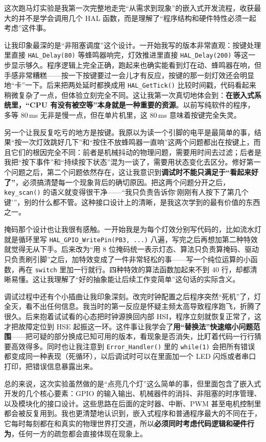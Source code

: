 \documentclass[UTF8,zihao=5,fontset=fandol]{ctexart}
\begin{document}
\begin{reportsection}{\ReflectionTitle}{\ReflectionHint}
  这次跑马灯实验是我第一次完整地走完“从需求到现象”的嵌入式开发流程，收获最大的并不是学会调用几个 HAL 函数，而是理解了“程序结构和硬件特性必须一起考虑”这件事。

  让我印象最深的是“非阻塞调度”这个设计。一开始我写的版本非常直观：按键处理里直接 \texttt{HAL\_Delay(80)} 等蜂鸣器响完，灯效推进里直接 \texttt{HAL\_Delay(200)} 等这一步显示够久。程序逻辑上完全正确，跑起来也确实能看到灯在动、蜂鸣器在响，但手感非常糟糕——按一下按键要过一会儿才有反应，按键的那一刻灯效还会明显地“卡”一下。后来把两处延时都换成用 \texttt{HAL\_GetTick()} 比较时间戳，代码看起来稍微复杂了一点，但体验立刻完全不同。这让我第一次真切地体会到：\textbf{在嵌入式系统里，“CPU 有没有被空等”本身就是一种重要的资源}。以前写纯软件的程序，多等 80\,ms 无非是慢一点，但在单片机里，这 80\,ms 意味着按键完全失灵。

  另一个让我反复吃亏的地方是按键。我原以为读一个引脚的电平是最简单的事，结果“按一次灯效跳好几下”和“按住不放蜂鸣器一直响”这两个问题都出在按键上，而且它们的根因完全不同：前者是机械抖动的物理问题，需要用时间去过滤；后者是我把“按下事件”和“持续按下状态”混为一谈了，需要用状态变化去区分。修好第一个问题之后，第二个问题依然存在，这让我意识到\textbf{调试时不能只满足于“看起来好了”}，必须搞清楚每一个现象背后的确切原因。把这两个问题分开之后，\texttt{key\_scan()} 的语义就变得很干净——“我只负责告诉你‘刚刚有人按下了第几个键’”，别的什么都不管。这种接口设计上的清晰，是我这次学到的最有价值的东西之一。

  掩码那个设计也让我很有感触。一开始我是为每个灯效分别写代码的，比如流水灯就是循环里写 \texttt{HAL\_GPIO\_WritePin(PB3, ...)} 八遍，写完之后再想加第二种特效就觉得无从下手。后来改为“用 8 位掩码统一表示灯态、算法只负责算掩码、驱动只负责刷引脚”之后，加特效变成了一件非常轻松的事——写一个纯位运算的小函数，再在 \texttt{switch} 里加一行就行。四种特效的算法函数加起来不到 40 行，却都清晰易懂。这让我理解了“好的抽象能让后续工作变简单”这句话的实际含义。

  调试过程中还有个小插曲让我印象深刻。改完时钟配置之后程序突然“死机”了，灯全灭，看不出任何信息。我当时的第一反应是怀疑主频太高导致程序跑飞，折腾了很久。后来抱着试试看的心态把时钟源换回内部 HSI，程序立刻就恢复正常了，这才把故障定位到 HSE 起振这一环。这件事让我学会了\textbf{用“替换法”快速缩小问题范围}——把可疑的部分换成已知可用的版本，看现象是否消失，比盯着代码一行行猜要高效得多。同时也让我注意到 \texttt{Error\_Handler()} 里的 \texttt{while(1)} 会把所有错误都变成同一种表现（死循环），以后调试时可以在里面加一个 LED 闪烁或者串口打印，把错误信息暴露出来。

  总的来说，这次实验虽然做的是“点亮几个灯”这么简单的事，但里面包含了嵌入式开发的几个核心要素：GPIO 的输入输出、机械器件的消抖、非阻塞的时序管理、以及模块化的接口设计。这些思路在后面的定时器、中断、PWM 甚至电机控制里都会被反复用到。我也更清楚地认识到，嵌入式程序和普通程序最大的不同在于，它每时每刻都在和真实的物理世界打交道，所以\textbf{必须同时考虑代码逻辑和硬件行为}，任何一方的疏忽都会直接体现在现象上。

  \par\medskip\noindent \ReviewNote
\end{reportsection}
\end{document}
